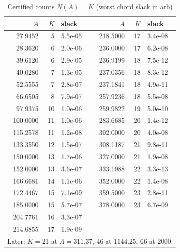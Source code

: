 \documentclass[journal]{IEEEtran}
\begin{document}
\begin{table}[t]\centering\caption{Certified counts $N(A) = K$ (worst chord slack in arb)}\label{tab:cert}
\footnotesize\setlength{\tabcolsep}{3pt}
\begin{tabular}{@{}rrl|rrl@{}}\toprule
$A$ & $K$ & slack & $A$ & $K$ & slack\\\midrule
27.9452 & 5 & 5.5e-05 & 218.5000 & 17 & 3.4e-08\\
28.3620 & 6 & 2.0e-06 & 236.0000 & 17 & 6.2e-08\\
39.6120 & 6 & 2.9e-05 & 236.9199 & 18 & 7.5e-12\\
40.0280 & 7 & 1.3e-05 & 237.0356 & 18 & 8.3e-12\\
52.5555 & 7 & 2.8e-07 & 237.1841 & 18 & 4.9e-11\\
66.6505 & 8 & 7.9e-07 & 257.9236 & 18 & 5.5e-08\\
97.9375 & 10 & 1.0e-06 & 259.9822 & 19 & 5.0e-10\\
100.0000 & 11 & 1.0e-06 & 283.6685 & 20 & 1.4e-12\\
115.2578 & 11 & 1.2e-08 & 302.0000 & 20 & 4.0e-08\\
133.3550 & 12 & 1.5e-07 & 308.1187 & 21 & 9.8e-11\\
150.0000 & 13 & 1.7e-06 & 327.0000 & 21 & 1.9e-08\\
152.0000 & 13 & 3.6e-07 & 333.1988 & 22 & 3.3e-13\\
166.6681 & 14 & 1.1e-06 & 352.0000 & 22 & 1.4e-08\\
172.4467 & 15 & 7.1e-09 & 359.5000 & 23 & 2.8e-11\\
185.0000 & 15 & 5.7e-07 & 378.0000 & 23 & 6.7e-09\\
204.7761 & 16 & 3.3e-07 & & & \\
214.6855 & 17 & 1.9e-09 & & & \\
\bottomrule
\multicolumn{6}{l}{Later: $K = 21$ at $A = 311.37$, $46$ at $1144.25$, $66$ at $2000$.}
\end{tabular}
\end{table}
\end{document}
